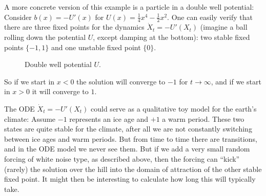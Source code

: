 \documentclass{article}
\newcommand{\1}{\mathbbm{1}}
\begin{document}
\begin{example*}
  A more concrete version of this example is a particle in a double well
  potential: Consider $b (x) = - U' (x)$ for $U (x) = \frac{1}{4} x^4 -
  \frac{1}{2} x^2$. One can easily verify that there are three fixed points
  for the dynamics $\dot{X}_t = - U' (X_t)$ (imagine a ball rolling down the
  potential $U$, except damping at the bottom): two stable fixed points $\{-
  1, 1\}$ and one unstable fixed point $\{0\}$.

  \begin{figure}[h]
    \caption{Double well potential $U$.}
  \end{figure}

  So if we start in $x < 0$ the solution will converge to $- 1$ for $t
  \rightarrow \infty$, and if we start in $x > 0$ it will converge to $1$.

  The ODE $\dot{X}_t = - U' (X_t)$ could serve as a qualitative toy model for
  the earth's climate: Assume $- 1$ represents an ice age and $+ 1$ a warm
  period. These two states are quite stable for the climate, after all we are
  not constantly switching between ice ages and warm periods. But from time to
  time there are transitions, and in the ODE model we never see them. But if
  we add a very small random forcing of white noise type, as described above,
  then the forcing can ``kick'' (rarely) the solution over the hill into the
  domain of attraction of the other stable fixed point. It might then be
  interesting to calculate how long this will typically take.
\end{example*}
\end{document}
